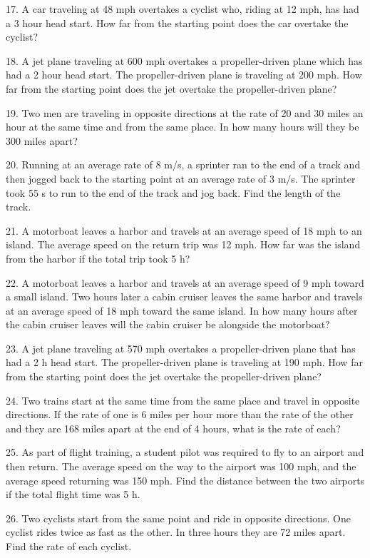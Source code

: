 \documentclass[11pt]{book}
\theoremstyle{definition}  %
\begin{document}
17. A car traveling at 48 mph overtakes a cyclist who, riding at 12 mph, has
had a 3 hour head start. How far from the starting point does
the car overtake the cyclist?

18. A jet plane traveling at 600 mph overtakes a propeller-driven plane which
has had a 2 hour head start. The propeller-driven plane is
traveling at 200 mph. How far from the starting point does the
jet overtake the propeller-driven plane?

19. Two men are traveling in opposite directions at the rate of 20 and 30
miles an hour at the same time and from the same place. In how
many hours will they be 300 miles apart?

20. Running at an average rate of 8 m/s, a sprinter ran to the end of a track
and then jogged back to the starting point at an average rate of
3 m/s. The sprinter took 55 s to run to the end of
the track and jog back. Find the length of the
track.

21. A motorboat leaves a harbor and travels at an average speed of 18 mph to
an island. The average speed on the return trip was 12 mph. How
far was the island from the harbor if the total trip took
5 h?

22. A motorboat leaves a harbor and travels at an average speed of 9 mph
toward a small island. Two hours later a cabin cruiser leaves the
same harbor and travels at an average speed of 18 mph
toward the same island. In how many hours after the cabin
cruiser leaves will the cabin cruiser be alongside the motorboat?

\pagebreak

23. A jet plane traveling at 570 mph overtakes a propeller-driven plane that
has had a 2 h head start. The propeller-driven plane is
traveling at 190 mph. How far from the starting point
does the jet overtake the propeller-driven plane?

24. Two trains start at the same time from the same place and travel in
opposite directions. If the rate of one is 6 miles per hour more
than the rate of the other and they are 168 miles apart
at the end of 4 hours, what is the rate of each?

25. As part of flight training, a student pilot was required to fly to an
airport and then return. The average speed on the way to the
airport was 100 mph, and the average speed returning was 150
mph. Find the distance between the two airports if the total
flight time was 5 h.

26. Two cyclists start from the same point and ride in opposite directions.
One cyclist rides twice as fast as the other. In three
hours they are 72 miles apart. Find the rate of each cyclist.
\end{document}
